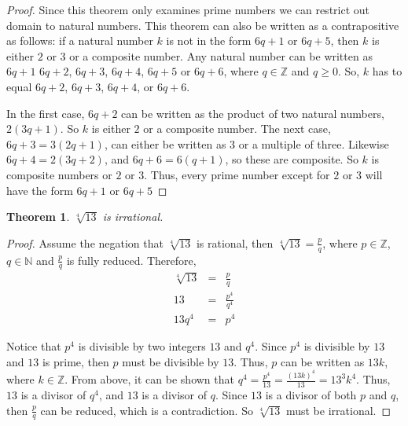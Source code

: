 \documentclass{article}
\newtheorem{theorem}{Theorem}
\begin{document}
\begin{proof}
    Since this theorem only examines prime numbers we can restrict out domain to natural numbers. This theorem can also be written as a contrapositive as follows: if a natural number $k$ is not in the form $6q +1$ or $6q+5$, then $k$ is either $2$ or $3$ or a composite number. Any natural number can be written as $6q+1$ $6q+2$, $6q+3$, $6q+4$, $6q+5$ or $6q+6$, where $q \in \mathbb{Z}$ and $q\geq 0$. So, $k$ has to equal $6q+2$, $6q+3$, $6q+4$, or $6q+6$.
    
    In the first case, $6q+2$ can be written as the product of two natural numbers, $2(3q+1)$. So $k$ is either $2$ or a composite number. The next case, $6q+3 = 3(2q+1)$, can either be written as $3$ or a multiple of three. Likewise $6q+4 = 2(3q+2)$, and $6q+6 = 6(q+1)$, so these are composite. So $k$ is composite numbers or $2$ or $3$. Thus, every prime number except for $2$ or $3$ will have the form $6q+1$ or $6q+5$
    
\end{proof}

\pagebreak

\begin{theorem}
$\sqrt[4]{13}$ is irrational.
\end{theorem}
\begin{proof}
    Assume the negation that $\sqrt[4]{13}$ is rational, then $\sqrt[4]{13} = \frac{p}{q}$, where $p \in \mathbb{Z}$, $q\in\mathbb{N}$ and  $\frac{p}{q}$ is fully reduced. Therefore,
    \begin{eqnarray*}
        \sqrt[4]{13} &=& \frac{p}{q}\\
        13 &=& \frac{p^4}{q^4}\\
        13q^4 &=&p^4
    \end{eqnarray*}
    
    Notice that $p^4$ is divisible by two integers $13$ and $q^4$. Since $p^4$ is divisible by $13$ and $13$ is prime, then $p$ must be divisible by $13$. Thus, $p$ can be written as $13k$, where $k\in \mathbb{Z}$. From above, it can be shown that $q^4 = \frac{p^4}{13} = \frac{(13k)^4}{13}=13^3 k^4$. Thus, $13$ is a divisor of $q^4$, and $13$ is a divisor of $q$. Since $13$ is a divisor of both $p$ and $q$, then $\frac{p}{q}$ can be reduced, which is a contradiction.  So $\sqrt[4]{13}$ must be irrational.
    
    
    
    
\end{proof}

\pagebreak
\end{document}
